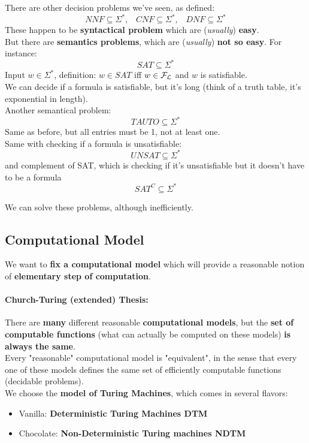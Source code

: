 \documentclass[11pt]{article}
\begin{document}
	There are other decision problems we've seen, as defined: 
	$$ NNF \subseteq \Sigma^\ast,  \;\;\; CNF \subseteq \Sigma^\ast,  \;\;\; DNF \subseteq \Sigma^\ast $$
	These happen to be \textbf{syntactical problem} which are (\textit{usually}) \textbf{easy}.\\
	
	But there are \textbf{semantics problems}, which are (\textit{usually}) \textbf{not so easy}. For instance: 
	$$ SAT \subseteq \Sigma^\ast$$
	Input $w \in \Sigma^\ast$, definition: $w \in SAT$ iff $w \in \mathcal{F}_\mathcal{L}$ and $w$ is satisfiable.\\
	We can decide if a formula is satisfiable, but it's long (think of a truth table, it's exponential in length).\\
	
	Another semantical problem:
	$$ TAUTO \subseteq \Sigma^\ast$$
	Same as before, but all entries must be 1, not  at least one.\\
	
	Same with checking if a formula is unsatisfiable:
	$$ UNSAT \subseteq \Sigma^\ast $$
	and complement of SAT, which is checking if it's unsatisfiable but it doesn't have to be a formula
	$$ SAT^C \subseteq \Sigma^\ast $$
	
	We can solve these problems, although inefficiently.\\
	
	\subsection{Computational Model}
	We want to \textbf{fix a computational model} which will provide a reasonable notion of \textbf{elementary step of computation}.\\
	
	\paragraph{Church-Turing (extended) Thesis:} There are \textbf{many} different reasonable \textbf{computational models}, but the \textbf{set of computable functions} (what can actually be computed on these models) \textbf{is always the same}. \\
	Every "reasonable" computational model is "equivalent", in the sense that every one of these models defines the same set of efficiently computable functions (decidable problems).\\
	
	We choose the \textbf{model of Turing Machines}, which comes in several flavors: 
	\begin{itemize}
		\item Vanilla: \textbf{Deterministic Turing Machines DTM}
		\item Chocolate: \textbf{Non-Deterministic Turing machines NDTM}
	\end{itemize}
	
\end{document}
